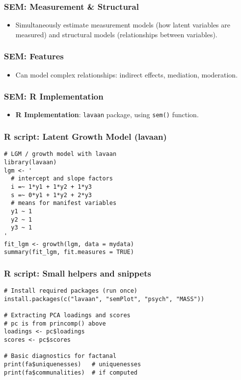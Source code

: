 \documentclass{beamer}
\newcommand{\code}[1]{\texttt{#1}}
\begin{document}
\begin{frame}
    \frametitle{SEM: Measurement \& Structural}
    \begin{itemize}
        \item Simultaneously estimate measurement models (how latent variables are measured) and structural models (relationships between variables).
    \end{itemize}
\end{frame}

\begin{frame}
    \frametitle{SEM: Features}
    \begin{itemize}
        \item Can model complex relationships: indirect effects, mediation, moderation.
    \end{itemize}
\end{frame}

\begin{frame}
    \frametitle{SEM: R Implementation}
    \begin{itemize}
        \item \textbf{R Implementation}: \code{lavaan} package, using \code{sem()} function.
    \end{itemize}
\end{frame}

\begin{frame}[fragile]
    \frametitle{R script: Latent Growth Model (lavaan)}
    \begin{verbatim}
# LGM / growth model with lavaan
library(lavaan)
lgm <- '
  # intercept and slope factors
  i =~ 1*y1 + 1*y2 + 1*y3
  s =~ 0*y1 + 1*y2 + 2*y3
  # means for manifest variables
  y1 ~ 1
  y2 ~ 1
  y3 ~ 1
'
fit_lgm <- growth(lgm, data = mydata)
summary(fit_lgm, fit.measures = TRUE)
    \end{verbatim}
\end{frame}

\begin{frame}[fragile]
    \frametitle{R script: Small helpers and snippets}
    \begin{verbatim}
# Install required packages (run once)
install.packages(c("lavaan", "semPlot", "psych", "MASS"))

# Extracting PCA loadings and scores
# pc is from princomp() above
loadings <- pc$loadings
scores <- pc$scores

# Basic diagnostics for factanal
print(fa$uniquenesses)   # uniquenesses
print(fa$communalities)  # if computed
    \end{verbatim}
\end{frame}
\end{document}
